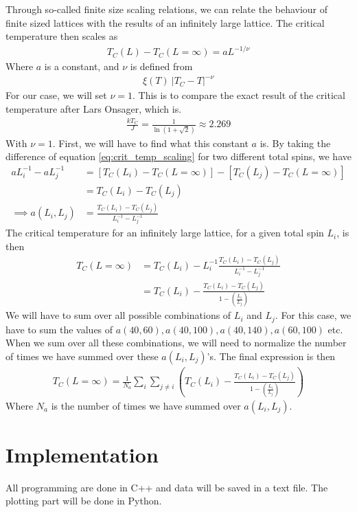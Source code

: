\documentclass[12pt]{article}
\begin{document}
Through so-called finite size scaling relations, we can relate the behaviour of finite sized lattices with the results of an infinitely large lattice. The critical temperature then scales as
\begin{align}
T_C(L) - T_C(L=\infty) = a L^{-1/\nu}
\label{eq:crit_temp_scaling}
\end{align}
Where $a$ is a constant, and $\nu$ is defined from
\begin{align*}
\xi(T) ~ |T_C - T|^{-\nu}
\end{align*}
For our case, we will set $\nu = 1$. This is to compare the exact result of the critical temperature after Lars Onsager, which is.
\begin{align}
\frac{kT_C}{J} = \frac{1}{\ln(1 + \sqrt{2})} \approx 2.269
\label{eq:Crit_temp_infty_exact}
\end{align}
With $\nu = 1$. First, we will have to find what this constant $a$ is. By taking the difference of equation \ref{eq:crit_temp_scaling} for two different total spins, we have
\begin{align*}
aL_i^{-1} - aL_j^{-1} &= [T_C(L_i) - T_C(L=\infty)] - [T_C(L_j) - T_C(L = \infty)] \\
&= T_C(L_i) - T_C(L_j)\\
\implies a(L_i, L_j) &= \frac{T_C(L_i) - T_C(L_j)}{L_i^{-1} - L_j^{-1}}
\end{align*}
The critical temperature for an infinitely large lattice, for a given total spin $L_i$, is then
\begin{align*}
T_C(L=\infty) &= T_C(L_i) - L_i^{-1}\frac{T_C(L_i) - T_C(L_j)}{L_i^{-1} - L_j^{-1}} \\
&= T_C(L_i) - \frac{T_C(L_i) - T_C(L_j)}{1 - \left(\frac{L_i}{L_j} \right)}
\end{align*}
We will have to sum over all possible combinations of $L_i$ and $L_j$. For this case, we have to sum the values of $a(40, 60), a(40, 100), a(40,140), a(60,100)$ etc. When we sum over all these combinations, we will need to normalize the number of times we have summed over these $a(L_i, L_j)$'s. The final expression is then
\begin{align}
T_C(L = \infty) = \frac{1}{N_a}\displaystyle \sum_i \sum_{j\neq i} \left( T_C(L_i) - \frac{T_C(L_i) - T_C(L_j)}{1 - \left( \frac{L_i}{L_j} \right)} \right)
\label{eq:Crit_temp_infty}
\end{align}
Where $N_a$ is the number of times we have summed over $a(L_i, L_j)$. 

\section{Implementation} \label{section:implement}
All programming are done in C++ and data will be saved in a text file. The plotting part will be done in Python.
\end{document}
